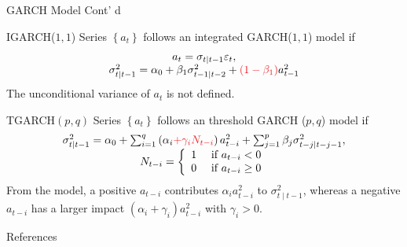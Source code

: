 \begin{frame}{GARCH Model Cont' d}
  \small{
  \begin{block}{IGARCH($1,1$) \cite{engle1986_igarch}}
    Series $\left\{a_{t}\right\}$ follows an integrated GARCH($1,1$) model if
    \begin{displaymath}
      \begin{array}{c} %
        a_{t}=\sigma_{t \mid t-1} \varepsilon_{t}, \\
        \sigma_{t \mid t-1}^{2}=\alpha_{0}+\beta_{1}\sigma_{t-1 \mid t-2}^2+\red{(1-\beta_{1})}a_{t-1}^{2}
      \end{array}
    \end{displaymath}
    The unconditional variance of $a_{t}$ is not defined.
  \end{block}
  
  \begin{block}{TGARCH$(p,q)$ \cite{zakoian1994_tgarch}}
    Series $\left\{a_{t}\right\}$ follows an threshold GARCH ($p,q$) model if
    \begin{displaymath}
      \begin{array}{c}
        \sigma_{t \mid t-1}^{2}=\alpha_{0}+\sum_{i=1}^{q}\left(\alpha_{i}\red{+\gamma_{i} N_{t-i}}\right) a_{t-i}^{2}+\sum_{j=1}^{p} \beta_{j} \sigma_{t-j \mid t-j-1}^{2},\\
        N_{t-i}=\left\{\begin{array}{ll}
          1 & \text { if } a_{t-i}<0 \\
          0 & \text { if } a_{t-i} \geq 0
          \end{array}\right.
      \end{array}
    \end{displaymath}
    From the model, a positive $a_{t-i}$ contributes $\alpha_{i}a_{t-i}^2$ to $\sigma_{t \mid t-1}^2$, whereas a negative $a_{t-i}$ has a larger impact $(\alpha_{i}+\gamma_{i})a_{t-i}^2$ with $\gamma_{i}>0$.
  \end{block}}
\end{frame}


	\begin{frame}[allowframebreaks]{References}
		
	\end{frame}